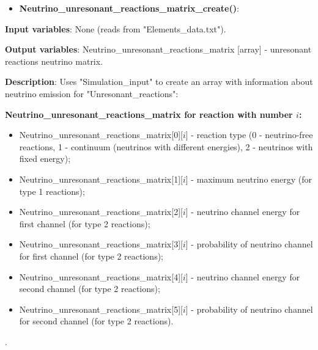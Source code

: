 \documentclass[a4paper,12pt]{article}
\newcommand{\namefunction}[4]{
  \begin{itemize}
    \item \textbf{#1}:
  \end{itemize}
  
  \textbf{Input variables}: #2.
  
  \textbf{Output variables}: #4.
  
  \textbf{Description}: #3.
}
\begin{document}
\vspace{1em}

\namefunction{Neutrino\_unresonant\_reactions\_matrix\_create()}{None (reads from "Elements\_data.txt")}{Uses "Simulation\_input" to create an array with information about neutrino emission for "Unresonant\_reactions":

\textbf{Neutrino\_unresonant\_reactions\_matrix for reaction with number $i$:}
\begin{itemize}
    \item Neutrino\_unresonant\_reactions\_matrix[0][$i$] - reaction type (0 - neutrino-free reactions, 1 - continuum (neutrinos with different energies), 2 - neutrinos with fixed energy);
    \item Neutrino\_unresonant\_reactions\_matrix[1][$i$] - maximum neutrino energy (for type 1 reactions);
    \item Neutrino\_unresonant\_reactions\_matrix[2][$i$] - neutrino channel energy for first channel (for type 2 reactions);
    \item Neutrino\_unresonant\_reactions\_matrix[3][$i$] - probability of neutrino channel for first channel (for type 2 reactions);
    \item Neutrino\_unresonant\_reactions\_matrix[4][$i$] - neutrino channel energy for second channel (for type 2 reactions);
    \item Neutrino\_unresonant\_reactions\_matrix[5][$i$] - probability of neutrino channel for second channel (for type 2 reactions).
\end{itemize}


}{Neutrino\_unresonant\_reactions\_matrix [array] - unresonant reactions neutrino matrix}

\vspace{1em}
\end{document}
